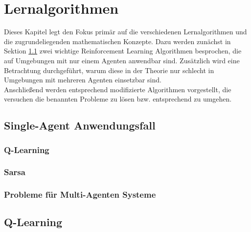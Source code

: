 \chapter{Lernalgorithmen}
\label{chap:learning}

Dieses Kapitel legt den Fokus primär auf die verschiedenen Lernalgorithmen und die zugrundeliegenden mathematischen Konzepte. Dazu werden zunächst in  Sektion \ref{chap:learning:single-agent} zwei wichtige Reinforcement Learning Algorithmen besprochen, die auf Umgebungen mit nur einem Agenten anwendbar sind. Zusätzlich wird eine Betrachtung durchgeführt, warum diese in der Theorie nur schlecht in Umgebungen mit mehreren Agenten einsetzbar sind. \\
Anschließend werden entsprechend modifizierte Algorithmen vorgestellt, die versuchen die benannten Probleme zu lösen bzw. entsprechend zu umgehen. 

\section{Single-Agent Anwendungsfall}
\label{chap:learning:single-agent}

\subsection{Q-Learning}

\subsection{Sarsa}

\subsection{Probleme für Multi-Agenten Systeme}

\section{Q-Learning}